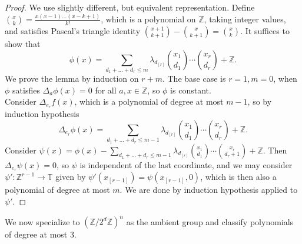 \documentclass[a4paper,11pt]{article}
\numberwithin{theorem}{section}
\theoremstyle{definition}
\begin{document}
\begin{proof} We use slightly different, but equivalent representation. Define $\binom{x}{k} = \frac{x(x-1)\dots (x-k + 1)}{k!}$, which is a polynomial on $\mathbb{Z}$, taking integer values, and satisfies Pascal's triangle identity $\binom{x + 1}{ k +1} - \binom{x}{k + 1} = \binom{x}{k}$. It suffices to show that 
\[\phi(x) = \sum_{d_1 + \dots + d_r \leq m} \lambda_{d_{[r]}} \binom{x_1}{d_1} \cdots \binom{x_r}{d_r} + \mathbb{Z}.\]
We prove the lemma by induction on $r + m$. The base case is $r = 1, m = 0$, when $\phi$ satisfies $\Delta_a \phi(x) = 0$ for all $a, x \in \mathbb{Z}$, so $\phi$ is constant.\\
Consider $\Delta_{e_r}f(x)$, which is a polynomial of degree at most $m-1$, so by induction hypothesis 
\[\Delta_{e_r}\phi(x) = \sum_{d_1 + \dots + d_r \leq m - 1} \lambda_{d_{[r]}} \binom{x_1}{d_1} \cdots \binom{x_r}{d_r} + \mathbb{Z}.\]
Consider $\psi(x) = \phi(x) - \sum_{d_1 + \dots + d_r \leq m - 1} \lambda_{d_{[r]}} \binom{x_1}{d_1} \cdots \binom{x_r}{d_r + 1} + \mathbb{Z}$. Then $\Delta_{e_r}\psi(x) = 0$, so $\psi$ is independent of the last coordinate, and we may consider $\psi' : \mathbb{Z}^{r-1} \to \mathbb{T}$ given by $\psi'(x_{[r-1]}) = \psi(x_{[r-1]}, 0)$, which is then also a polynomial of degree at most $m$. We are done by induction hypothesis applied to $\psi'$.\end{proof}

We now specialize to $(\mathbb{Z}/2^d\mathbb{Z})^n$ as the ambient group and classify polynomials of degree at most 3.
\end{document}
